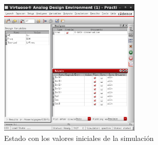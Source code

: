 \begin{figure}[H]%
\begin {center}
\includegraphics[width=0.6\textwidth]{figures/State1Config.PNG}
\caption{Estado con los valores iniciales de la simulación}
\label{fig:State1}
\end {center}
\end{figure} 

